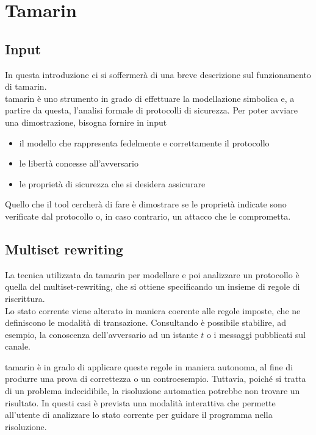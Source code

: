 \section{Tamarin}

\subsection{Input}

In questa introduzione ci si soffermerà di una breve descrizione sul funzionamento di \gls{tamarin}. \\
\gls{tamarin} è uno strumento in grado di effettuare la modellazione simbolica e, a partire da questa, l'analisi formale di protocolli di sicurezza.
Per poter avviare una dimostrazione, bisogna fornire in input
\begin{itemize}
    \item il modello che rappresenta fedelmente e correttamente il protocollo
    \item le libertà concesse all'avversario
    \item le proprietà di sicurezza che si desidera assicurare
\end{itemize}
Quello che il tool cercherà di fare è dimostrare se le proprietà indicate sono verificate dal protocollo o, in caso contrario, un attacco che le comprometta. \\

\subsection{Multiset rewriting}
La tecnica utilizzata da \gls{tamarin} per modellare e poi analizzare un protocollo è quella del \gls{multiset-rewriting}, che si ottiene specificando un insieme di regole di riscrittura. \\

Lo stato corrente viene alterato in maniera coerente alle regole imposte, che ne definiscono le modalità di transazione.
Consultando è possibile stabilire, ad esempio, la conoscenza dell'avversario ad un istante $t$ o i messaggi pubblicati sul canale.

\gls{tamarin} è in grado di applicare queste regole in maniera autonoma, al fine di produrre una prova di correttezza o un controesempio.
Tuttavia, poiché si tratta di un problema indecidibile, la risoluzione automatica potrebbe non trovare un risultato.
In questi casi è prevista una modalità interattiva che permette all'utente di analizzare lo stato corrente per guidare il programma nella risoluzione.